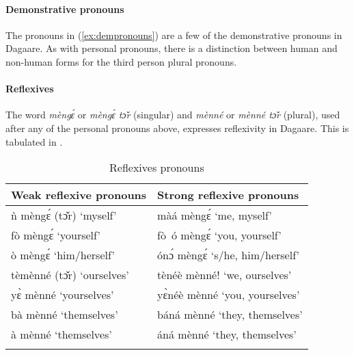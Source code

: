  







\paragraph{Demonstrative pronouns}

The pronouns in (\ref{ex:dempronouns}) are a few of the demonstrative pronouns in Dagaare. As
with personal pronouns, there is a distinction between human and non-human forms for the
third person plural pronouns.



\paragraph{Reflexives}
The word \textit{mèngɛ́} or \textit{mèngɛ́ tɔ̌r} (singular) and \textit{mènné} or \textit{mènné tɔ̌r} (plural), used
after any of the personal pronouns above, expresses reflexivity in Dagaare. This is tabulated
in .

\begin{table}
    
    \begin{tabularx}{\textwidth}{Xl}\lsptoprule
Weak reflexive pronouns &  Strong reflexive pronouns \\\midrule
ǹ mèngɛ́ (tɔ̌r) ‘myself’     & màá mèngɛ́ ‘me, myself’\\
fò mèngɛ́  ‘yourself’&fò~ó mèngɛ́ ‘you, yourself’\\
ò mèngɛ́  ‘him/herself’ &  ónɔ́ mèngɛ́ ‘s/he, him/herself’\\
tèmènné (tɔ̌r) ‘ourselves’ &    tènéè mènné! ‘we, ourselves'\\
yɛ̀ mènné ‘yourselves’& yɛ̀néè mènné ‘you, yourselves'\\
bà mènné ‘themselves’& báná mènné ‘they, themselves’ \\
à mènné ‘themselves’&áná mènné ‘they, themselves’\\\lspbottomrule
    \end{tabularx}
    \caption{Reflexives pronouns}
    \label{tab:reflexives}
\end{table}  


